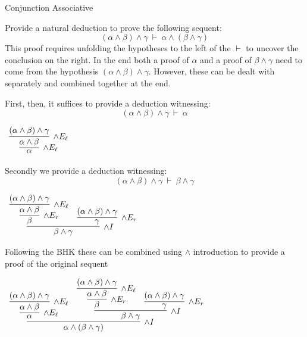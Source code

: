 \documentclass{book}
\begin{document}
    \begin{eg}{Conjunction Associative}

        Provide a natural deduction to prove the following sequent: $$(\alpha \land \beta) \land \gamma \ \vdash \ \alpha \land (\beta \land \gamma) $$
        This proof requires unfolding the hypotheses to the left of the $\vdash$ to uncover the conclusion on the right. In the end both a proof of $\alpha$ and a proof of $\beta \land \gamma$ need to come from the hypothesis $(\alpha \land \beta) \land \gamma$. However, these can be dealt with separately and combined together at the end. 

        First, then, it suffices to provide a deduction witnessing: $$(\alpha \land \beta) \land \gamma \ \vdash \ \alpha$$

        \begin{center}
            $\begin{array}{c}
                \infer[\land E_{\ell}]{\alpha}
                    {\infer[\land E_{\ell}]{\alpha \land \beta}
                        {(\alpha \land \beta) \land \gamma}}
            \end{array}$
        \end{center}

        Secondly we provide a deduction witnessing: $$(\alpha \land \beta) \land \gamma \ \vdash \ \beta \land \gamma$$

        \begin{center}
            $\begin{array}{c}
                \infer[\land I]{\beta \land \gamma}
                    {\infer[\land E_{r}]{\beta} 
                        {\infer[\land E_{\ell}]{\alpha \land \beta}
                            {(\alpha \land \beta) \land \gamma}}
                    &
                    \infer[\land E_{r}]{\gamma} 
                        {(\alpha \land \beta) \land \gamma}}
            \end{array}$
        \end{center}

        Following the BHK these can be combined using $\land$ introduction to provide a proof of the original sequent 

            \begin{center}
                $\begin{array}{c}
                    \infer[\land I]{\alpha \land (\beta \land \gamma)}
                        {\infer[\land E_{\ell}]{\alpha}
                            {\infer[\land E_{\ell}]{\alpha \land \beta}
                            {(\alpha \land \beta) \land \gamma}}
                            &
                            \infer[\land I]{\beta \land \gamma}
                                {\infer[\land E_{r}]{\beta} 
                                    {\infer[\land E_{\ell}]{\alpha \land \beta}
                                        {(\alpha \land \beta) \land \gamma}}
                        &
                        \infer[\land E_{r}]{\gamma} 
                        {(\alpha \land \beta) \land \gamma}}}
                \end{array}$
            \end{center}
    \end{eg}
\end{document}
